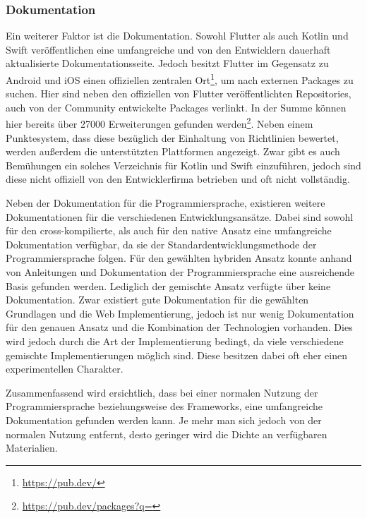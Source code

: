 \subsubsection{Dokumentation}
Ein weiterer Faktor ist die Dokumentation. Sowohl Flutter als auch Kotlin und Swift veröffentlichen eine umfangreiche und von den Entwicklern dauerhaft aktualisierte Dokumentationsseite. Jedoch besitzt Flutter im Gegensatz zu Android und iOS einen offiziellen zentralen Ort\footnote{\url{https://pub.dev/}}, um nach externen Packages zu suchen. Hier sind neben den offiziellen von Flutter veröffentlichten Repositories, auch von der Community entwickelte Packages verlinkt. In der Summe können hier bereits über 27000 Erweiterungen gefunden werden\footnote{\url{https://pub.dev/packages?q=}}. Neben einem Punktesystem, dass diese bezüglich der Einhaltung von Richtlinien bewertet, werden außerdem die unterstützten Plattformen angezeigt. Zwar gibt es auch Bemühungen ein solches Verzeichnis für Kotlin und Swift einzuführen, jedoch sind diese nicht offiziell von den Entwicklerfirma betrieben und oft nicht vollständig.

Neben der Dokumentation für die Programmiersprache, existieren weitere Dokumentationen für die verschiedenen Entwicklungsansätze. Dabei sind sowohl für den cross-kompilierte, als auch für den native Ansatz eine umfangreiche Dokumentation verfügbar, da sie der Standardentwicklungsmethode der Programmiersprache folgen. Für den gewählten hybriden Ansatz konnte anhand von Anleitungen und Dokumentation der Programmiersprache eine ausreichende Basis gefunden werden. Lediglich der gemischte Ansatz verfügte über keine Dokumentation. Zwar existiert gute Dokumentation für die gewählten Grundlagen und die Web Implementierung, jedoch ist nur wenig Dokumentation für den genauen Ansatz und die Kombination der Technologien vorhanden. Dies wird jedoch durch die Art der Implementierung bedingt, da viele verschiedene gemischte Implementierungen möglich sind. Diese besitzen dabei oft eher einen experimentellen Charakter.

Zusammenfassend wird ersichtlich, dass bei einer normalen Nutzung der Programmiersprache beziehungsweise des Frameworks, eine umfangreiche Dokumentation gefunden werden kann. Je mehr man sich jedoch von der normalen Nutzung entfernt, desto geringer wird die Dichte an verfügbaren Materialien. 

